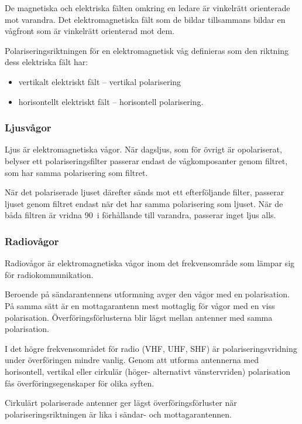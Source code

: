 De magnetiska och elektriska fälten omkring en ledare är vinkelrätt orienterade
mot varandra.
Det elektromagnetiska fält som de bildar tillsammans bildar en vågfront som
är vinkelrätt orienterad mot dem.

Polariseringsriktningen för en elektromagnetisk våg definieras som den riktning
dess elektriska fält har:
\begin{itemize}
  \item vertikalt elektriskt fält -- vertikal polarisering
  \item horisontellt elektriskt fält -- horisontell polarisering.
\end{itemize}

\subsubsection{Ljusvågor}

Ljus är elektromagnetiska vågor.
När dagsljus, som för övrigt är opolariserat, belyser ett polariseringsfilter
passerar endast de vågkomposanter genom filtret, som har samma polarisering
som filtret.

När det polariserade ljuset därefter sänds mot ett efterföljande filter,
passerar ljuset genom filtret endast när det har samma polarisering som ljuset.
När de båda filtren är vridna 90\degree~i förhållande till varandra, passerar
inget ljus alls.

\subsubsection{Radiovågor}

Radiovågor är elektromagnetiska vågor inom det frekvensområde som lämpar sig
för radiokommunikation.

Beroende på sändarantennens utformning avger den vågor med en polarisation.
På samma sätt är en mottagarantenn mest mottaglig för vågor med en viss
polarisation.
Överföringsförlusterna blir lägst mellan antenner med samma polarisation.

I det högre frekvensområdet för radio (VHF, UHF, SHF) är polariseringsvridning
under överföringen min\-d\-re vanlig.
Genom att utforma antennerna med horisontell, vertikal eller cirkulär (höger-
alternativt vänstervriden) polarisation fås överföringsegenskaper för olika
syften.

Cirkulärt polariserade antenner ger lägst överföringsförluster när
polariseringsriktningen är lika i sän\-d\-ar- och mottagarantennen.

